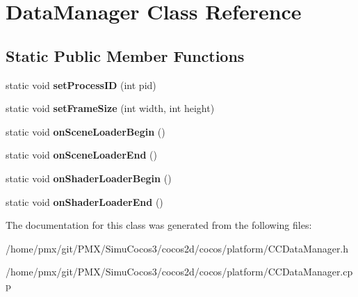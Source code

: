\hypertarget{classDataManager}{}\section{Data\+Manager Class Reference}
\label{classDataManager}
\subsection*{Static Public Member Functions}
\begin{DoxyCompactItemize}
\item 
\mbox{\label{classDataManager_a252694d669bae7bb29f5b92707580a1a}} 
static void {\bfseries set\+Process\+ID} (int pid)
\item 
\mbox{\label{classDataManager_a827a0ea58344eff15e98dffe9af3d371}} 
static void {\bfseries set\+Frame\+Size} (int width, int height)
\item 
\mbox{\label{classDataManager_a086ef2c50ff105862791db088c5ab6b9}} 
static void {\bfseries on\+Scene\+Loader\+Begin} ()
\item 
\mbox{\label{classDataManager_a55b7aaea50289f1329cc5717a1dd5767}} 
static void {\bfseries on\+Scene\+Loader\+End} ()
\item 
\mbox{\label{classDataManager_a46e952fb63f5a1beb582e2fdf037f467}} 
static void {\bfseries on\+Shader\+Loader\+Begin} ()
\item 
\mbox{\label{classDataManager_a764e0be727503dad6e4411e4546a5574}} 
static void {\bfseries on\+Shader\+Loader\+End} ()
\end{DoxyCompactItemize}


The documentation for this class was generated from the following files\+:\begin{DoxyCompactItemize}
\item 
/home/pmx/git/\+P\+M\+X/\+Simu\+Cocos3/cocos2d/cocos/platform/C\+C\+Data\+Manager.\+h\item 
/home/pmx/git/\+P\+M\+X/\+Simu\+Cocos3/cocos2d/cocos/platform/C\+C\+Data\+Manager.\+cpp\end{DoxyCompactItemize}
